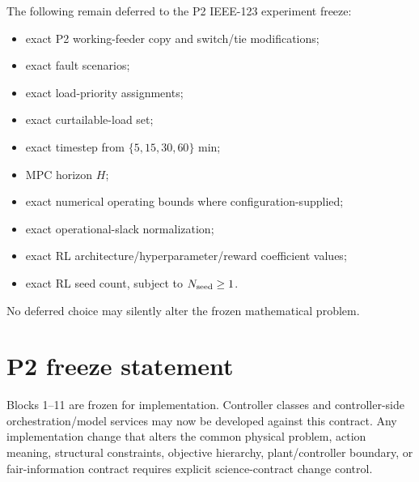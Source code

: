\documentclass[11pt]{article}
\begin{document}
The following remain deferred to the P2 IEEE-123 experiment freeze:
\begin{itemize}
\item exact P2 working-feeder copy and switch/tie modifications;
\item exact fault scenarios;
\item exact load-priority assignments;
\item exact curtailable-load set;
\item exact timestep from $\{5,15,30,60\}$ min;
\item MPC horizon $H$;
\item exact numerical operating bounds where configuration-supplied;
\item exact operational-slack normalization;
\item exact RL architecture/hyperparameter/reward coefficient values;
\item exact RL seed count, subject to $N_{\rm seed}\ge1$.
\end{itemize}

No deferred choice may silently alter the frozen mathematical problem.

\section{P2 freeze statement}
Blocks 1--11 are frozen for implementation. Controller classes and controller-side
orchestration/model services may now be developed against this contract. Any
implementation change that alters the common physical problem, action meaning,
structural constraints, objective hierarchy, plant/controller boundary, or
fair-information contract requires explicit science-contract change control.



\end{document}

